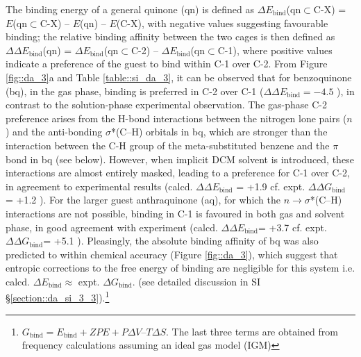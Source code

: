 \documentclass[../../main.tex]{subfiles}
\begin{document}
The binding energy of a general quinone (qn) is defined as $\Delta E_\text{bind}$(qn$\subset$C-X) = $E$(qn$\subset$C-X) – $E$(qn) – $E$(C-X), with negative values suggesting favourable binding; the relative binding affinity between the two cages is then defined as $\Delta\Delta E_\text{bind}$(qn) = $\Delta E_\text{bind}$(qn$\subset$C-2) – $\Delta E_\text{bind}$(qn$\subset$C-1), where positive values indicate a preference of the guest to bind within C-1 over C-2. From Figure \ref{fig::da_3}a and Table \ref{table::si_da_3}, it can be observed that for benzoquinone (bq), in the gas phase, binding is preferred in C-2 over C-1 ($\Delta\Delta E_\text{bind} = -4.5$ \kcal), in contrast to the solution-phase experimental observation. The gas-phase C-2 preference arises from the H-bond interactions between the nitrogen lone pairs ($n$) and the anti-bonding $\sigma$*(C–H) orbitals in bq, which are stronger than the interaction between the C-H group of the meta-substituted benzene and the $\pi$ bond in bq (see below). However, when implicit DCM solvent is introduced, these interactions are almost entirely masked, leading to a preference for C-1 over C-2, in agreement to experimental results (calcd. $\Delta\Delta E_\text{bind}$ = +1.9 \kcalx cf. expt.\cite{MartCentelles2018} $\Delta\Delta G_\text{bind}$ = +1.2 \kcal). For the larger guest anthraquinone (aq), for which the $n \rightarrow \sigma$*(C–H) interactions are not possible, binding in C-1 is favoured in both gas and solvent phase, in good agreement with experiment (calcd. $\Delta\Delta E_\text{bind}$= +3.7 \kcalx cf. expt. $\Delta\Delta G_\text{bind}$= +5.1 \kcal). Pleasingly, the absolute binding affinity of bq was also predicted to within chemical accuracy (Figure \ref{fig::da_3}), which suggest that entropic corrections to the free energy of binding are negligible for this system i.e. calcd. $\Delta E_\text{bind} \approx$ expt. $\Delta G_\text{bind}$. (see detailed discussion in SI §\ref{section::da_si_3_3}).\footnote{$G_\text{bind} = E_\text{bind}+ZPE+P\Delta V–T \Delta S$. The last three terms are obtained from frequency calculations assuming an ideal gas model (IGM)} 
\end{document}
